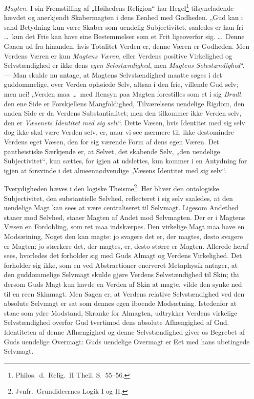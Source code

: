 \documentclass[12pt]{book}
\begin{document}
\emph{Magten.} I sin Fremstilling af „Høihedens Religion“ har
Hegel\footnote{Philos.\ d.\ Relig.\ II Theil. S.\ 55--56.}
tilsyneladende hævdet og anerkjendt Skabermagten i dens Eenhed med
Godheden. „Gud kan i sand Betydning kun være Skaber som uendelig
Subjectivitet, saaledes er han fri \dots\ kun det Frie kan have sine
Bestemmelser som et Frit ligeoverfor sig. \dots\ Denne Gaaen ud fra
hinanden, hvis Totalitet Verden er, denne Væren er Godheden. Men
Verdens Væren er kun \emph{Magtens Væren}, eller Verdens positive
Virkelighed og Selvstændighed er ikke dens \emph{egen
Selvstændighed}, men \emph{Magtens Selvstændighed}“. --- Man skulde
nu antage, at Magtens Selvstændighed maatte søges i det
guddommelige, over Verden ophøiede Selv, altsaa i den frie, villende
Gud selv; men nei! „Verden maa \dots\ med Hensyn paa Magten
forestilles som et i sig \emph{Brudt}: den ene Side er Forskjellens
Mangfoldighed, Tilværelsens uendelige Rigdom, den anden Side er da
Verdens Substantialitet; men den tilkommer ikke Verden selv, den er
\emph{Væsenets Identitet med sig selv}“. Dette Væsen, hvis Identitet
med sig selv dog ikke skal være Verden selv, er, naar vi see
nærmere til, ikke destomindre Verdens eget Væsen, den for sig
værende Form af dens egen Væren. Det pantheistiske Særkjende er, at
Selvet, det skabende Selv, „den uendelige Subjectivitet“, kun
sættes, for igjen at udslettes, kun kommer i en Antydning for igjen
at forsvinde i det almeennødvendige „Væsens Identitet med sig selv“.

Tvetydigheden hæves i den logiske Theisme\footnote{Jvnfr.\
Grundideernes Logik I og II.}. Her bliver den ontologiske
Subjectivitet, den substantielle
Selvhed, reflecteret i sig selv saaledes, at den uendelige Magt kan
sees at være centraliseret til Selvmagt. Ligesom Andethed staaer mod
Selvhed, staaer Magten af Andet mod Selvmagten. Der er i Magtens
Væsen en Fordobling, som ret maa indskærpes. Den virkelige Magt maa
have en Modsætning, Noget den kan magte: jo svagere det er, der
magtes, desto svagere er Magten; jo stærkere det, der magtes, er,
desto større er Magten. Allerede heraf sees, hvorledes det forholder
sig med Guds Almagt og Verdens Virkelighed. Det forholder sig ikke,
som en ved Abstractioner enerveret Metaphysik antager, at den
guddommelige Selvmagt skulde gjøre Verdens Selvstændighed til Skin;
thi dersom Guds Magt kun havde en Verden af Skin at magte, vilde den
synke ned til en reen Skinmagt. Men Sagen er, at Verdens relative
Selvstændighed ved den absolute Selvmagt er sat som dennes egen
iboende Modsætning. Istedenfor at staae som ydre Modstand, Skranke
for Almagten, udtrykker Verdens virkelige Selvstændighed overfor Gud
tvertimod dens absolute Afhængighed af Gud. Identiteten af denne
Afhængighed og denne Selvstændighed giver os Begrebet af Guds
uendelige Overmagt: Guds uendelige Overmagt er Eet med hans
ubetingede Selvmagt.
\end{document}
